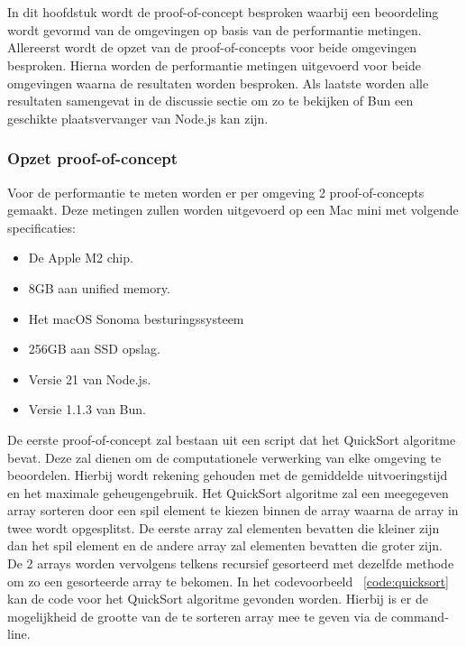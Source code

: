 \chapter{}%
\label{ch:proof-of-concept}

In dit hoofdstuk wordt de proof-of-concept besproken 
waarbij een beoordeling wordt gevormd van de omgevingen op basis van de performantie metingen.
Allereerst wordt de opzet van de proof-of-concepts voor beide omgevingen besproken.
Hierna worden de performantie metingen uitgevoerd voor beide omgevingen waarna de resultaten worden besproken.
Als laatste worden alle resultaten samengevat in de discussie sectie om zo te bekijken of Bun een geschikte plaatsvervanger
van Node.js kan zijn.

\subsection{Opzet proof-of-concept}
Voor de performantie te meten worden er per omgeving 2 proof-of-concepts gemaakt. 
Deze metingen zullen worden uitgevoerd op een Mac mini met volgende specificaties:
\begin{itemize}
  \item De Apple M2 chip.
  \item 8GB aan unified memory.
  \item Het macOS Sonoma besturingssysteem
  \item 256GB aan SSD opslag.
  \item Versie 21 van Node.js.
  \item Versie 1.1.3 van Bun.
\end{itemize}
De eerste proof-of-concept zal bestaan uit een script dat het QuickSort algoritme bevat. 
Deze zal dienen om de computationele verwerking van elke omgeving te beoordelen. 
Hierbij wordt rekening gehouden met de gemiddelde uitvoeringstijd en het maximale geheugengebruik.
Het QuickSort algoritme zal een meegegeven array sorteren door een spil element te kiezen binnen de array
waarna de array in twee wordt opgesplitst. De eerste array zal elementen bevatten die kleiner zijn dan het spil element 
en de andere array zal elementen bevatten die groter zijn. 
De 2 arrays worden vervolgens telkens recursief gesorteerd met dezelfde methode om zo een gesorteerde array te bekomen.
In het codevoorbeeld ~\ref{code:quicksort} kan de code voor het QuickSort algoritme gevonden worden.
Hierbij is er de mogelijkheid de grootte van de te sorteren array mee te geven via de command-line.


